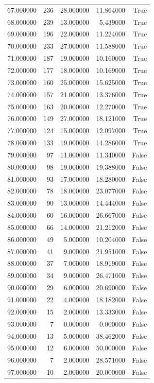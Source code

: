 \begin{longtable}{rrrrr}
67.000000 & 236 & 28.000000 & 11.864000 & True \\
68.000000 & 239 & 13.000000 & 5.439000 & True \\
69.000000 & 196 & 22.000000 & 11.224000 & True \\
70.000000 & 233 & 27.000000 & 11.588000 & True \\
71.000000 & 187 & 19.000000 & 10.160000 & True \\
72.000000 & 177 & 18.000000 & 10.169000 & True \\
73.000000 & 160 & 25.000000 & 15.625000 & True \\
74.000000 & 157 & 21.000000 & 13.376000 & True \\
75.000000 & 163 & 20.000000 & 12.270000 & True \\
76.000000 & 149 & 27.000000 & 18.121000 & True \\
77.000000 & 124 & 15.000000 & 12.097000 & True \\
78.000000 & 133 & 19.000000 & 14.286000 & True \\
79.000000 & 97 & 11.000000 & 11.340000 & False \\
80.000000 & 98 & 19.000000 & 19.388000 & False \\
81.000000 & 93 & 17.000000 & 18.280000 & False \\
82.000000 & 78 & 18.000000 & 23.077000 & False \\
83.000000 & 90 & 13.000000 & 14.444000 & False \\
84.000000 & 60 & 16.000000 & 26.667000 & False \\
85.000000 & 66 & 14.000000 & 21.212000 & False \\
86.000000 & 49 & 5.000000 & 10.204000 & False \\
87.000000 & 41 & 9.000000 & 21.951000 & False \\
88.000000 & 37 & 7.000000 & 18.919000 & False \\
89.000000 & 34 & 9.000000 & 26.471000 & False \\
90.000000 & 29 & 6.000000 & 20.690000 & False \\
91.000000 & 22 & 4.000000 & 18.182000 & False \\
92.000000 & 15 & 2.000000 & 13.333000 & False \\
93.000000 & 7 & 0.000000 & 0.000000 & False \\
94.000000 & 13 & 5.000000 & 38.462000 & False \\
95.000000 & 12 & 6.000000 & 50.000000 & False \\
96.000000 & 7 & 2.000000 & 28.571000 & False \\
97.000000 & 10 & 2.000000 & 20.000000 & False \\
\end{longtable}
